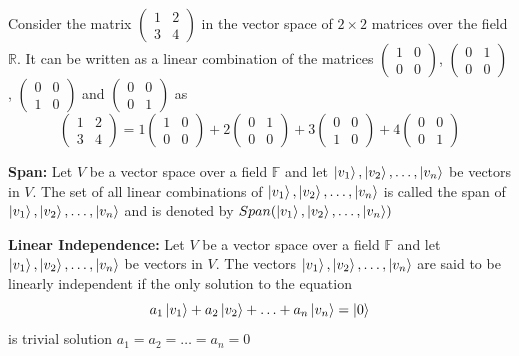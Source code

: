 \begin{example}
    Consider the matrix $\begin{pmatrix} 1 & 2 \\ 3 & 4 \end{pmatrix}$ in the vector space of $2\times 2$ matrices over the field $\mathbb{R}$. It can be written as a linear combination of the matrices
    $\begin{pmatrix} 1 & 0 \\ 0 & 0 \end{pmatrix}$, $\begin{pmatrix} 0 & 1 \\ 0 & 0 \end{pmatrix}$, $\begin{pmatrix} 0 & 0 \\ 1 & 0 \end{pmatrix}$ and $\begin{pmatrix} 0 & 0 \\ 0 & 1 \end{pmatrix}$ as
    \[
        \begin{pmatrix} 1 & 2 \\ 3 & 4 \end{pmatrix}=1\begin{pmatrix} 1 & 0 \\ 0 & 0 \end{pmatrix}+2\begin{pmatrix} 0 & 1 \\ 0 & 0 \end{pmatrix}+3\begin{pmatrix} 0 & 0 \\ 1 & 0 \end{pmatrix}+4\begin{pmatrix} 0 & 0 \\ 0 & 1 \end{pmatrix}
    \]
\end{example}

\begin{definition}
    \textbf{Span:} Let $V$ be a vector space over a field $\mathbb{F}$ and 
    let $\ket{v_1},\ket{v_2},\ldots,\ket{v_n}$ be vectors in $V$. 
    The set of all linear combinations of $\ket{v_1},\ket{v_2},\ldots,\ket{v_n}$ 
    is called the span of $\ket{v_1},\ket{v_2},\ldots,\ket{v_n}$ 
    and is denoted by $Span(\ket{v_1},\ket{v_2},\ldots,\ket{v_n})$
\end{definition}

\begin{definition}
    \textbf{Linear Independence:} Let $V$ be a vector space over a field $\mathbb{F}$ and let $\ket{v_1},\ket{v_2},\ldots,\ket{v_n}$ be vectors in $V$. The vectors $\ket{v_1},\ket{v_2},\ldots,\ket{v_n}$ are said to be linearly independent if the only solution to the equation
    \begin{equation}
        a_1\ket{v_1}+a_2\ket{v_2}+\ldots+a_n\ket{v_n}=\ket{0}
        \label{eq:Linear Independence}
    \end{equation}
    is trivial solution $a_1=a_2=\ldots=a_n=0$
\end{definition}

